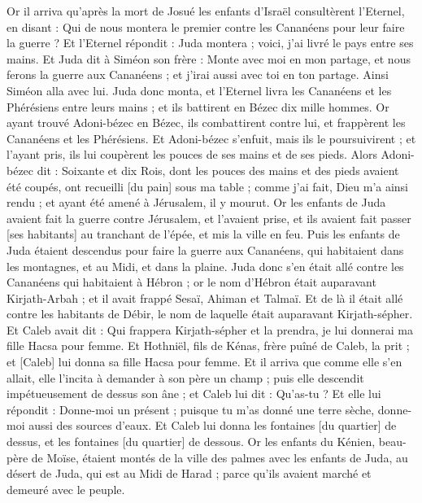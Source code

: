\BFont
\begin{multicols}{2}
\VerseOne{}Or il arriva qu'après la mort de Josué les enfants d'Israël consultèrent l'Eternel, en disant : Qui de nous montera le premier contre les Cananéens pour leur faire la guerre ?
Et l'Eternel répondit : Juda montera ; voici, j'ai livré le pays entre ses mains.
Et Juda dit à Siméon son frère : Monte avec moi en mon partage, et nous ferons la guerre aux Cananéens ; et j'irai aussi avec toi en ton partage. Ainsi Siméon alla avec lui.
Juda donc monta, et l'Eternel livra les Cananéens et les Phérésiens entre leurs mains ; et ils battirent en Bézec dix mille hommes.
Or ayant trouvé Adoni-bézec en Bézec, ils combattirent contre lui, et frappèrent les Cananéens et les Phérésiens.
Et Adoni-bézec s'enfuit, mais ils le poursuivirent ; et l'ayant pris, ils lui coupèrent les pouces de ses mains et de ses pieds.
Alors Adoni-bézec dit : Soixante et dix Rois, dont les pouces des mains et des pieds avaient été coupés, ont recueilli [du pain] sous ma table ; comme j'ai fait, Dieu m'a ainsi rendu ; et ayant été amené à Jérusalem, il y mourut.
Or les enfants de Juda avaient fait la guerre contre Jérusalem, et l'avaient prise, et ils avaient fait passer [ses habitants] au tranchant de l'épée, et mis la ville en feu.
Puis les enfants de Juda étaient descendus pour faire la guerre aux Cananéens, qui habitaient dans les montagnes, et au Midi, et dans la plaine.
Juda donc s'en était allé contre les Cananéens qui habitaient à Hébron ; or le nom d'Hébron était auparavant Kirjath-Arbah ; et il avait frappé Sesaï, Ahiman et Talmaï.
Et de là il était allé contre les habitants de Débir, le nom de laquelle était auparavant Kirjath-sépher.
Et Caleb avait dit : Qui frappera Kirjath-sépher et la prendra, je lui donnerai ma fille Hacsa pour femme.
Et Hothniël, fils de Kénas, frère puîné de Caleb, la prit ; et [Caleb] lui donna sa fille Hacsa pour femme.
Et il arriva que comme elle s'en allait, elle l'incita à demander à son père un champ ; puis elle descendit impétueusement de dessus son âne ; et Caleb lui dit : Qu'as-tu ?
Et elle lui répondit : Donne-moi un présent ; puisque tu m'as donné une terre sèche, donne-moi aussi des sources d'eaux. Et Caleb lui donna les fontaines [du quartier] de dessus, et les fontaines [du quartier] de dessous.
Or les enfants du Kénien, beau-père de Moïse, étaient montés de la ville des palmes avec les enfants de Juda, au désert de Juda, qui est au Midi de Harad ; parce qu'ils avaient marché et demeuré avec le peuple.

\end{multicols}
